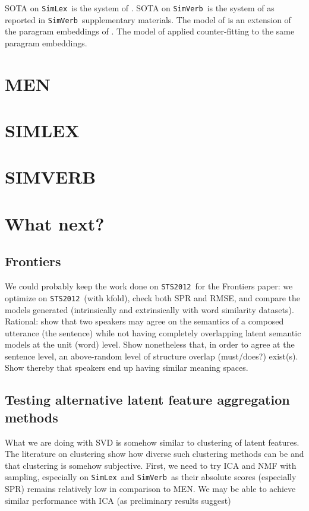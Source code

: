 \documentclass[utf8]{article}
\newcommand\simlex{\texttt{SimLex}}
\newcommand\simverb{\texttt{SimVerb}}
\newcommand\sts{\texttt{STS2012}}
\begin{document}
SOTA on \simlex\ is the system of \cite{recskietal2016}. SOTA on \simverb\ is the system of \cite{mrkvsicetal2016} as reported in \simverb\ supplementary materials.
The model of \cite{recskietal2016} is an extension of the paragram embeddings of \cite{wietingetal2015}.
The model of \cite{mrkvsicetal2016} applied counter-fitting to the same paragram embeddings.

\section{MEN}



\section{SIMLEX}



\section{SIMVERB}



\section{What next?}

\subsection{Frontiers}
We could probably keep the work done on \sts\ for the Frontiers paper: we optimize on \sts\ (with kfold), check both SPR and RMSE, and compare the models generated (intrinsically and extrinsically with word similarity datasets).
Rational: show that two speakers may agree on the semantics of a composed utterance (the sentence) while not having completely overlapping latent semantic models at the unit (word) level. Show nonetheless that, in order to agree at the sentence level, an above-random level of structure overlap (must/does?) exist(s). Show thereby that speakers end up having similar meaning spaces.

\subsection{Testing alternative latent feature aggregation methods}
What we are doing with SVD is somehow similar to clustering of latent features.
The literature on clustering show how diverse such clustering methods can be and that clustering is somehow subjective. First, we need to try ICA and NMF with sampling, especially on \simlex\ and \simverb\ as their absolute scores (especially SPR) remains relatively low in comparison to MEN. We may be able to achieve similar performance with ICA (as preliminary results suggest)
\end{document}
